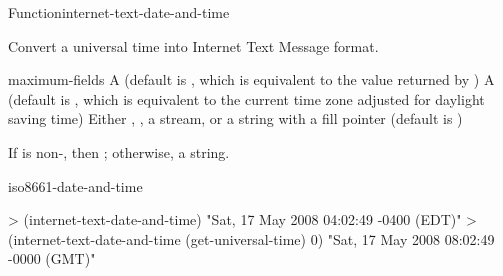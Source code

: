 \documentclass[10pt,twoside,english,pdftex]{article}
\begin{document}
\begin{functiondoc}{Function}{internet-text-date-and-time}{%
      
    \returns{} }
% 

\fnsyntax

\fnpurpose Convert a universal time into Internet Text Message format.

\fnpackage {}

\fnmodule {}

\fnargs
\begin{args}{maximum-fields}
 A  (default is \nil,
  which is equivalent to the value returned by
  )
 A  (default is \nil,
  which is equivalent to the current time zone adjusted for daylight
  saving time)
\arg[destination] Either \nil, , a stream, or a string with a fill 
pointer (default is \nil)
\end{args}

\fnreturns If  is non-\nil, then \nil; otherwise, a string.

\begin{alsos}{iso8661-date-and-time}
\end{alsos}

\fnexamples
%
\W\supp
\begin{example}
> (internet-text-date-and-time)
"Sat, 17 May 2008 04:02:49 -0400 (EDT)"
> (internet-text-date-and-time (get-universal-time) 0)
"Sat, 17 May 2008 08:02:49 -0000 (GMT)"
\end{example}

\end{functiondoc}

\end{document}
